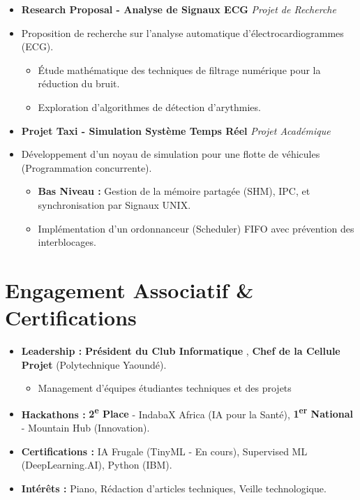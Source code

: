 \documentclass[a4paper,11pt]{article}
\begin{document}
\begin{itemize}[leftmargin=*, label={-}]
\item \textbf{Research Proposal - Analyse de Signaux ECG} \hfill \textit{Projet de Recherche}
\vspace{-2pt}
\item \small{Proposition de recherche sur l'analyse automatique d'électrocardiogrammes (ECG).}
    \begin{itemize}[leftmargin=0.4cm, nosep, label=\tiny$\bullet$]
        \item \small{Étude mathématique des techniques de filtrage numérique pour la réduction du bruit.}
        \item \small{Exploration d'algorithmes de détection d'arythmies.}
    \end{itemize}
    \vspace{1pt}
\item \textbf{Projet Taxi - Simulation Système Temps Réel} \hfill \textit{Projet Académique}
\vspace{-2pt}
\item \small{Développement d'un noyau de simulation pour une flotte de véhicules (Programmation concurrente).}
    \begin{itemize}[leftmargin=0.4cm, nosep, label=\tiny$\bullet$]
        \item \small{\textbf{Bas Niveau :} Gestion de la mémoire partagée (SHM), IPC, et synchronisation par Signaux UNIX.}
        \item \small{Implémentation d'un ordonnanceur (Scheduler) FIFO avec prévention des interblocages.}
    \end{itemize}
    \vspace{1pt}

\end{itemize}

\section{Engagement Associatif \& Certifications}
\begin{itemize}[leftmargin=*, nosep]
    \item \textbf{Leadership :} \textbf{Président du Club Informatique} , \textbf{Chef de la Cellule Projet} (Polytechnique Yaoundé).
    \begin{itemize}[leftmargin=0.4cm, nosep, label=\tiny$\bullet$]
         \item \small{Management d'équipes étudiantes techniques et des projets}
    \end{itemize}
    \item \textbf{Hackathons :} \textbf{2\textsuperscript{e} Place} - IndabaX Africa (IA pour la Santé), \textbf{1\textsuperscript{er} National } - Mountain Hub (Innovation).
    \item \textbf{Certifications :} IA Frugale (TinyML - En cours), Supervised ML (DeepLearning.AI), Python (IBM).
    \item \textbf{Intérêts :} Piano, Rédaction d'articles techniques, Veille technologique.
\end{itemize}
\end{document}
